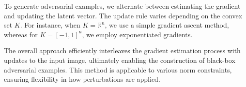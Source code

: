 To generate adversarial examples, we alternate between estimating the gradient and updating the latent vector. The update rule varies depending on the convex set $K$. For instance, when $K = \mathbb{R}^n$, we use a simple gradient ascent method, whereas for $K = [-1, 1]^n$, we employ exponentiated gradients. 

The overall approach efficiently interleaves the gradient estimation process with updates to the input image, ultimately enabling the construction of black-box adversarial examples. This method is applicable to various norm constraints, ensuring flexibility in how perturbations are applied.
